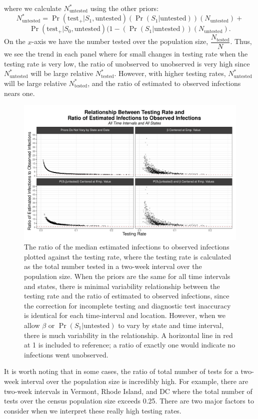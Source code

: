 \documentclass[12pt,twoside]{smiththesis}
\begin{document}
\noindent where we calculate \(N^*_{\text{untested}}\) using the other priors:
\[N^*_{\text{untested}} =\Pr(\text{test}_+|S_1,\text{untested}) (\Pr(S_1 | \text{untested})) ( N_{\text{untested}} ) + \]
\[\Pr(\text{test}_+|S_0,\text{untested}) (1-(\Pr(S_1 | \text{untested})) ( N_{\text{untested}} ).\]
On the \(x\)-axis we have the number tested over the population size, \(\dfrac{N_{\text{tested}}}{N}\). Thus, we see the trend in each panel where for small changes in testing rate when the testing rate is very low, the ratio of unobserved to unobserved is very high since \(N^*_{\text{untested}}\) will be large relative \(N^*_{\text{tested}}\). However, with higher testing rates, \(N^*_{\text{untested}}\) will be large relative \(N^*_{\text{tested}}\), and the ratio of estimated to observed infections nears one.
\begin{figure}
\includegraphics[width=1\linewidth]{figure/testing_rate_ratio} \caption{\label{fig:testrate}The ratio of the median estimated infections to observed infections plotted against the testing rate, where the testing rate is calculated as the total number tested in a two-week interval over the population size. When the priors are the same for all time intervals and states, there is minimal variability relationship between the testing rate and the ratio of estimated to observed infections, since the correction for incomplete testing and diagnostic test inaccuracy is identical for each time-interval and location. However, when we allow $\beta$ or $\Pr(S_1|\text{untested})$ to vary by state and time interval, there is much variability in the relationship. A horizontal line in red at 1 is included to reference; a ratio of exactly one would indicate no infections went unobserved.}\label{fig:unnamed-chunk-76}
\end{figure}
It is worth noting that in some cases, the ratio of total number of tests for a two-week interval over the population size is incredibly high. For example, there are two-week intervals in Vermont, Rhode Island, and DC where the total number of tests over the census population size exceeds 0.25. There are two major factors to consider when we interpret these really high testing rates.
\end{document}
